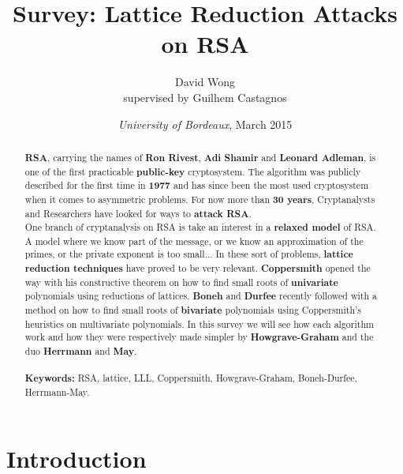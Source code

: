 \documentclass[a4paper,11pt]{article}
\title{Survey: Lattice Reduction Attacks on RSA}
\author{David Wong\\
\small{supervised by Guilhem Castagnos}}
\date{\emph{University of Bordeaux}, March 2015}
\begin{document}
\maketitle

\renewcommand{\abstractname}{Abstract}
\begin{abstract}
\textbf{RSA}, carrying the names of \textbf{Ron Rivest}, \textbf{Adi Shamir} and \textbf{Leonard Adleman}, is one of the first practicable \textbf{public-key} cryptosystem. The algorithm was publicly described for the first time in \textbf{1977} and has since been the most used cryptosystem when it comes to asymmetric problems. For now more than \textbf{30 years}, Cryptanalysts and Researchers have looked for ways to \textbf{attack RSA}.\\
One branch of cryptanalysis on RSA is take an interest in a \textbf{relaxed model} of RSA. A model where we know part of the message, or we know an approximation of the primes, or the private exponent is too small... In these sort of problems, \textbf{lattice reduction techniques} have proved to be very relevant. \textbf{Coppersmith} opened the way with his constructive theorem on how to find small roots of \textbf{univariate} polynomials using reductions of lattices. \textbf{Boneh} and \textbf{Durfee} recently followed with a method on how to find small roots of \textbf{bivariate} polynomials using Coppersmith's heuristics on multivariate polynomials. In this survey we will see how each algorithm work and how they were respectively made simpler by \textbf{Howgrave-Graham} and the duo \textbf{Herrmann} and \textbf{May}.\\
\\
\textbf{Keywords:} RSA, lattice, LLL, Coppersmith, Howgrave-Graham, Boneh-Durfee, Herrmann-May.\\

\end{abstract}

\section{Introduction}\label{introduction}
\end{document}

